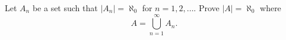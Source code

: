 \begin{exercise}
  \label{ex:hw01:countable-union}
  Let $A_n$ be a set such that $|A_n|=\aleph_0$ for $n=1,2,\ldots$.
  Prove $|A|=\aleph_0$ where
  \[
    A=\bigcup_{n=1}^{\infty} A_n.
  \]
\end{exercise}
